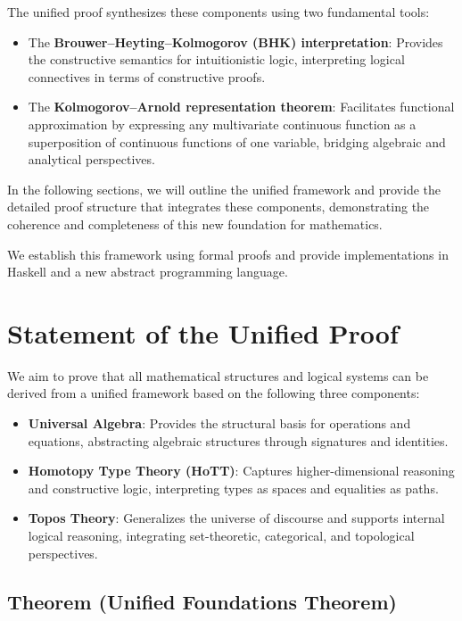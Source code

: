 \documentclass{article}
\begin{document}
The unified proof synthesizes these components using two fundamental tools:

\begin{itemize}
    \item The \textbf{Brouwer–Heyting–Kolmogorov (BHK) interpretation}: Provides the constructive semantics for intuitionistic logic, interpreting logical connectives in terms of constructive proofs.
    \item The \textbf{Kolmogorov–Arnold representation theorem}: Facilitates functional approximation by expressing any multivariate continuous function as a superposition of continuous functions of one variable, bridging algebraic and analytical perspectives.
\end{itemize}

In the following sections, we will outline the unified framework and provide the detailed proof structure that integrates these components, demonstrating the coherence and completeness of this new foundation for mathematics.

We establish this framework using formal proofs and provide implementations in Haskell and a new abstract programming language.

\section{Statement of the Unified Proof}

We aim to prove that all mathematical structures and logical systems can be derived from a unified framework based on the following three components:

\begin{itemize}
    \item \textbf{Universal Algebra}: Provides the structural basis for operations and equations, abstracting algebraic structures through signatures and identities.
    \item \textbf{Homotopy Type Theory (HoTT)}: Captures higher-dimensional reasoning and constructive logic, interpreting types as spaces and equalities as paths.
    \item \textbf{Topos Theory}: Generalizes the universe of discourse and supports internal logical reasoning, integrating set-theoretic, categorical, and topological perspectives.
\end{itemize}

\subsection*{Theorem (Unified Foundations Theorem)}
\end{document}
